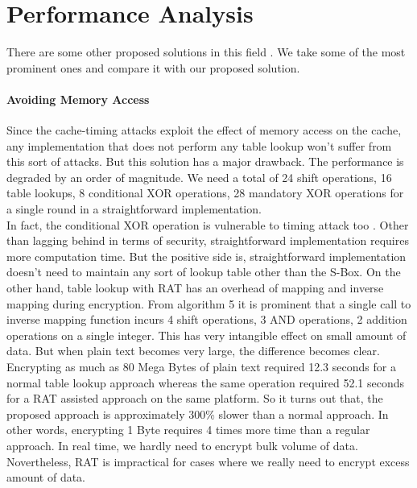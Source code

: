 \section{Performance Analysis}

There are some other proposed solutions in this field \citep{osvik,paladi,rudra2001efficient,matsui2006far,matsui2007power,konighofer2008fast,meushaw2005device}. We take some of the most prominent ones and compare it with our proposed solution.\\

\paragraph{Avoiding Memory Access}
Since the cache-timing attacks exploit the effect of memory access on the cache, any implementation that does not perform any table lookup won't suffer from this sort of attacks. But this solution has a major drawback. The performance is degraded by an order of magnitude. We need a total of 24 shift operations, 16 table lookups, 8 conditional XOR operations, 28 mandatory XOR operations for a single round in a straightforward implementation.\\

In fact, the conditional XOR operation is vulnerable to timing attack too \citep{stallings5}. Other than lagging behind in terms of security, straightforward implementation requires more computation time. But the positive side is, straightforward implementation doesn't need to maintain any sort of lookup table other than the S-Box. On the other hand, table lookup with RAT has an overhead of mapping and inverse mapping during encryption. From algorithm 5 it is prominent that a single call to inverse mapping function incurs 4 shift operations, 3 AND operations, 2 addition operations on a single integer. This has very intangible effect on small amount of data. But when plain text becomes very large, the difference becomes clear.\\

Encrypting as much as 80 Mega Bytes of plain text required 12.3 seconds for a normal table lookup approach whereas the same operation required 52.1 seconds for a RAT assisted approach on the same platform. So it turns out that, the proposed approach is approximately 300\% slower than a normal approach. In other words, encrypting 1 Byte requires 4 times more time than a regular approach. In real time, we hardly need to encrypt bulk volume of data. Novertheless, RAT is impractical for cases where we really need to encrypt excess amount of data.\\

